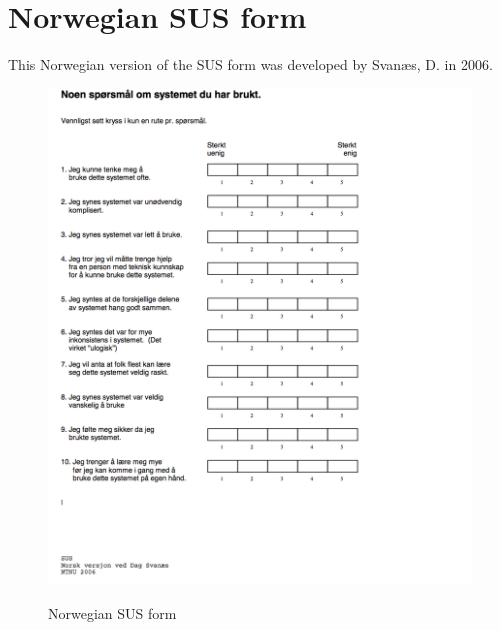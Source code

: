 \chapter{Norwegian SUS form}
\label{app:norsksus}

This Norwegian version of the SUS form was developed by Svan\ae s, D. in 2006.

\begin{figure}[H] 
	\centering
		\includegraphics[width=0.8\paperwidth]{Pictures/norwegiansus.png}
	\label{fig:norwegiansusform}
	\caption{Norwegian SUS form}
\end{figure}